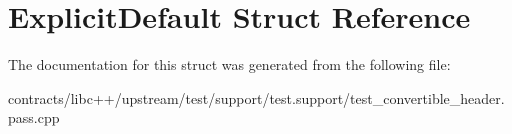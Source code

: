 \hypertarget{struct_explicit_default}{}\section{Explicit\+Default Struct Reference}
\label{struct_explicit_default}


The documentation for this struct was generated from the following file\+:\begin{DoxyCompactItemize}
\item 
contracts/libc++/upstream/test/support/test.\+support/test\+\_\+convertible\+\_\+header.\+pass.\+cpp\end{DoxyCompactItemize}
